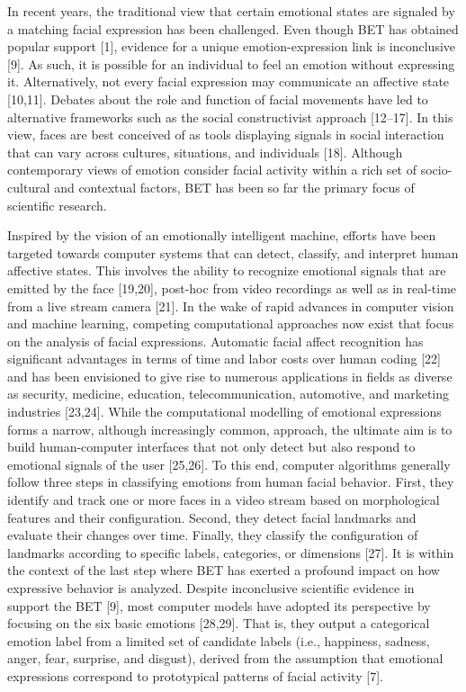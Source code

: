 \documentclass[10pt,letterpaper]{article}
\begin{document}
In recent years, the traditional view that certain emotional states are signaled by a matching facial expression has been challenged. Even though BET has obtained popular support {[}1{]}, evidence for a unique emotion-expression link is inconclusive {[}9{]}. As such, it is possible for an individual to feel an emotion without expressing it. Alternatively, not every facial expression may communicate an affective state {[}10,11{]}. Debates about the role and function of facial movements have led to alternative frameworks such as the social constructivist approach {[}12--17{]}. In this view, faces are best conceived of as tools displaying signals in social interaction that can vary across cultures, situations, and individuals {[}18{]}. Although contemporary views of emotion consider facial activity within a rich set of socio-cultural and contextual factors, BET has been so far the primary focus of scientific research.

Inspired by the vision of an emotionally intelligent machine, efforts have been targeted towards computer systems that can detect, classify, and interpret human affective states. This involves the ability to recognize emotional signals that are emitted by the face {[}19,20{]}, post-hoc from video recordings as well as in real-time from a live stream camera {[}21{]}. In the wake of rapid advances in computer vision and machine learning, competing computational approaches now exist that focus on the analysis of facial expressions. Automatic facial affect recognition has significant advantages in terms of time and labor costs over human coding {[}22{]} and has been envisioned to give rise to numerous applications in fields as diverse as security, medicine, education, telecommunication, automotive, and marketing industries {[}23,24{]}. While the computational modelling of emotional expressions forms a narrow, although increasingly common, approach, the ultimate aim is to build human-computer interfaces that not only detect but also respond to emotional signals of the user {[}25,26{]}. To this end, computer algorithms generally follow three steps in classifying emotions from human facial behavior. First, they identify and track one or more faces in a video stream based on morphological features and their configuration. Second, they detect facial landmarks and evaluate their changes over time. Finally, they classify the configuration of landmarks according to specific labels, categories, or dimensions {[}27{]}. It is within the context of the last step where BET has exerted a profound impact on how expressive behavior is analyzed. Despite inconclusive scientific evidence in support the BET {[}9{]}, most computer models have adopted its perspective by focusing on the six basic emotions {[}28,29{]}. That is, they output a categorical emotion label from a limited set of candidate labels (i.e., happiness, sadness, anger, fear, surprise, and disgust), derived from the assumption that emotional expressions correspond to prototypical patterns of facial activity {[}7{]}.
\end{document}
